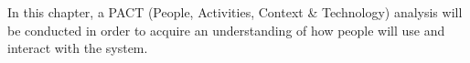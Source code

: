 In this chapter, a PACT (People, Activities, Context \& Technology) analysis will be conducted in order to acquire an understanding of how people will use and interact with the system.